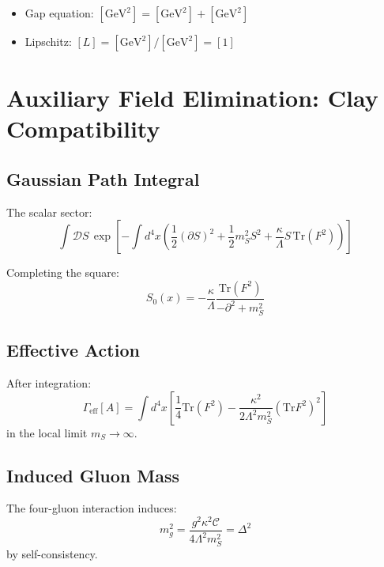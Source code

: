 \documentclass[11pt,a4paper]{article}
\renewcommand{\Tr}{\mathrm{Tr}}
\theoremstyle{plain}
\theoremstyle{definition}
\begin{document}
\begin{itemize}
\item Gap equation: $[\mathrm{GeV}^2] = [\mathrm{GeV}^2] + [\mathrm{GeV}^2]$ \checkmark
\item Lipschitz: $[L] = [\mathrm{GeV}^2]/[\mathrm{GeV}^2] = [1]$ \checkmark
\end{itemize}

\section{Auxiliary Field Elimination: Clay Compatibility}
\label{app:auxiliary}

\subsection{Gaussian Path Integral}

The scalar sector:
\begin{equation}
\int\mathcal{D}S\, \exp\left[-\int d^4x\left(\frac{1}{2}(\partial S)^2 + \frac{1}{2}m_S^2 S^2
+ \frac{\kappa}{\Lambda}S\,\Tr(F^2)\right)\right]
\end{equation}

Completing the square:
\begin{equation}
S_0(x) = -\frac{\kappa}{\Lambda}\frac{\Tr(F^2)}{-\partial^2 + m_S^2}
\end{equation}

\subsection{Effective Action}

After integration:
\begin{equation}
\Gamma_{\mathrm{eff}}[A] = \int d^4x\left[\frac{1}{4}\Tr(F^2)
- \frac{\kappa^2}{2\Lambda^2 m_S^2}(\Tr F^2)^2\right]
\end{equation}
in the local limit $m_S \to \infty$.

\subsection{Induced Gluon Mass}

The four-gluon interaction induces:
\begin{equation}
m_g^2 = \frac{g^2\kappa^2\mathcal{C}}{4\Lambda^2 m_S^2} = \Delta^2
\end{equation}
by self-consistency.
\end{document}
